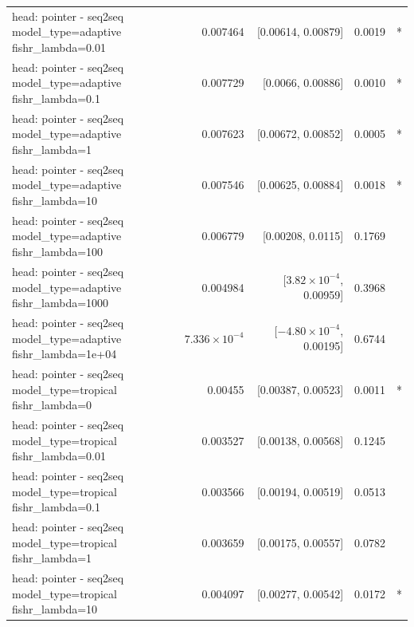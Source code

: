 \documentclass[10pt]{article}
\makeatletter
\newcommand{\stackcell}[1]{\begin{tabular}[t]{@{}l@{}}#1\end{tabular}}
\makeatother
\begin{document}
{\begin{longtable}{lrrrl}
\stackcell{head: pointer - seq2seq\\\footnotesize model\_type=adaptive fishr\_lambda=0.01 } & 0.007464 & [0.00614, 0.00879] & 0.0019 & *\\
\stackcell{head: pointer - seq2seq\\\footnotesize model\_type=adaptive fishr\_lambda=0.1 } & 0.007729 & [0.0066, 0.00886] & 0.0010 & *\\
\stackcell{head: pointer - seq2seq\\\footnotesize model\_type=adaptive fishr\_lambda=1 } & 0.007623 & [0.00672, 0.00852] & 0.0005 & *\\
\stackcell{head: pointer - seq2seq\\\footnotesize model\_type=adaptive fishr\_lambda=10 } & 0.007546 & [0.00625, 0.00884] & 0.0018 & *\\
\stackcell{head: pointer - seq2seq\\\footnotesize model\_type=adaptive fishr\_lambda=100 } & 0.006779 & [0.00208, 0.0115] & 0.1769 & \\
\stackcell{head: pointer - seq2seq\\\footnotesize model\_type=adaptive fishr\_lambda=1000 } & 0.004984 & [$3.82\times10^{-4}$, 0.00959] & 0.3968 & \\
\stackcell{head: pointer - seq2seq\\\footnotesize model\_type=adaptive fishr\_lambda=1e+04 } & $7.336\times10^{-4}$ & [$-4.80\times10^{-4}$, 0.00195] & 0.6744 & \\
\stackcell{head: pointer - seq2seq\\\footnotesize model\_type=tropical fishr\_lambda=0 } & 0.00455 & [0.00387, 0.00523] & 0.0011 & *\\
\stackcell{head: pointer - seq2seq\\\footnotesize model\_type=tropical fishr\_lambda=0.01 } & 0.003527 & [0.00138, 0.00568] & 0.1245 & \\
\stackcell{head: pointer - seq2seq\\\footnotesize model\_type=tropical fishr\_lambda=0.1 } & 0.003566 & [0.00194, 0.00519] & 0.0513 & \\
\stackcell{head: pointer - seq2seq\\\footnotesize model\_type=tropical fishr\_lambda=1 } & 0.003659 & [0.00175, 0.00557] & 0.0782 & \\
\stackcell{head: pointer - seq2seq\\\footnotesize model\_type=tropical fishr\_lambda=10 } & 0.004097 & [0.00277, 0.00542] & 0.0172 & *\\

\end{longtable}}
\end{document}

